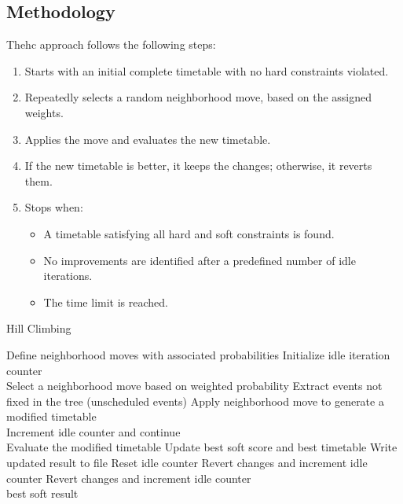 \subsection{Methodology}

The\ac{hc} approach follows the following steps:

\begin{enumerate}
\item Starts with an initial complete timetable with no hard constraints violated.
\item Repeatedly selects a random neighborhood move, based on the assigned weights.
\item Applies the move and evaluates the new timetable.
\item If the new timetable is better, it keeps the changes; otherwise, it reverts them.
\item Stops when:
	\begin{itemize}
	\item A timetable satisfying all hard and soft constraints is found.
	\item No improvements are identified after a predefined number of idle iterations.
	\item The time limit is reached.
	\end{itemize}
\end{enumerate}

\begin{algorithm}
\caption{Hill Climbing}\label{run_hill_climbing}
\begin{algorithmic}[1]
    \State Define neighborhood moves with associated probabilities
    \State Initialize idle iteration counter
\\
        \State Select a neighborhood move based on weighted probability
        \State Extract events not fixed in the tree (unscheduled events)
        \State Apply neighborhood move to generate a modified timetable
\\
            \State Increment idle counter and continue
        \EndIf
\\
	\State Evaluate the modified timetable
                \State Update best soft score and best timetable
                \State Write updated result to file
                    \State {}
                \EndIf
                \State Reset idle counter
            \Else
                \State Revert changes and increment idle counter
            \EndIf
        \Else
            \State Revert changes and increment idle counter
        \EndIf
    \EndWhile
\\
    \State \Return best soft result
\EndFunction
\end{algorithmic}
\end{algorithm}

